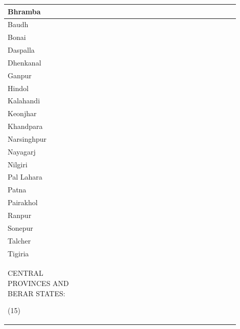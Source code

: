 \begin{longtable}{|p{0.30\linewidth}|p{0.30\linewidth}|p{0.30\linewidth}|}
 \\
\hline
Bhramba

 \\
\hline
Baudh

 \\
\hline
Bonai

 \\
\hline
Daspalla

 \\
\hline
Dhenkanal

 \\
\hline
Ganpur

 \\
\hline
Hindol

 \\
\hline
Kalahandi

 \\
\hline
Keonjhar

 \\
\hline
Khandpara

 \\
\hline
Narsinghpur

 \\
\hline
Nayagarj

 \\
\hline
Nilgiri

 \\
\hline
Pal Lahara

 \\
\hline
Patna

 \\
\hline
Pairakhol

 \\
\hline
Ranpur

 \\
\hline
Sonepur

 \\
\hline
Talcher

 \\
\hline
Tigiria

 \\
\hline
CENTRAL PROVINCES AND BERAR STATES:

(15)

 & \multirow{16}{*}{





















}
\end{longtable}
